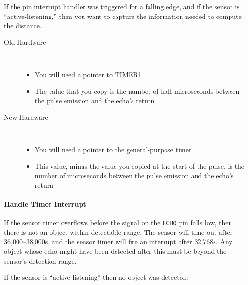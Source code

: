 If the pin interrupt handler was triggered for a falling edge, and if the sensor is ``active-listening,'' then you want to capture the information needed to compute the distance.
\begin{description}
        \begin{description}
            \item[Old Hardware] \phantom{x} \\
                \begin{itemize}
                    \item You will need a pointer to TIMER1
                    \item The value that you copy is the number of half-microseconds between the pulse emission and the echo's return
                \end{itemize}
            \item[New Hardware] \phantom{x} \\
                \begin{itemize}
                    \item You will need a pointer to the general-purpose timer
                    \item This value, minus the value you copied at the start of the pulse, is the number of microseconds between the pulse emission and the echo's return
                \end{itemize}
        \end{description}
\end{description}

\paragraph{Handle Timer Interrupt}

If the sensor timer overflows before the signal on the \lstinline{ECHO} pin falls low, then there is not an object within detectable range.
The sensor will time-out after 36,000--38,000\textmu s, and the sensor timer will fire an interrupt after 32,768\textmu s.
Any object whose echo might have been detected after this must be beyond the sensor's detection range.

If the sensor is ``active-listening'' then no object was detected:
\begin{description}
\end{description}

